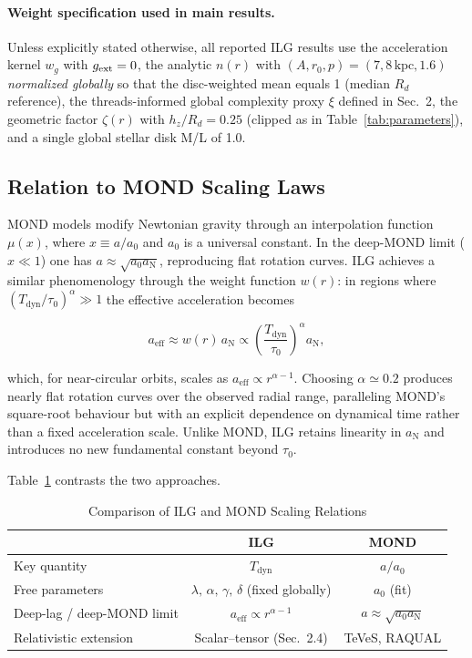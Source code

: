 \documentclass[12pt,a4paper]{article}
\begin{document}
\paragraph{Weight specification used in main results.} Unless explicitly stated otherwise, all reported ILG results use the acceleration kernel $w_g$ with $g_{\rm ext}=0$, the analytic $n(r)$ with $(A,r_0,p)=(7,8\,\mathrm{kpc},1.6)$ \emph{normalized globally} so that the disc-weighted mean equals 1 (median $R_d$ reference), the threads-informed global complexity proxy $\xi$ defined in Sec.~2, the geometric factor $\zeta(r)$ with $h_z/R_d=0.25$ (clipped as in Table~\ref{tab:parameters}), and a single global stellar disk M/L of 1.0.

\subsection{Relation to MOND Scaling Laws}

MOND models modify Newtonian gravity through an interpolation function $\mu(x)$, where $x \equiv a/a_0$ and $a_0$ is a universal constant.  In the deep-MOND limit ($x \ll 1$) one has $a \approx \sqrt{a_0 a_\mathrm{N}}$, reproducing flat rotation curves.  ILG achieves a similar phenomenology through the weight function $w(r)$: in regions where $(T_\mathrm{dyn}/\tau_0)^\alpha \gg 1$ the effective acceleration becomes

\begin{equation}
a_\mathrm{eff} \approx w(r) \, a_\mathrm{N} \propto \left(\frac{T_\mathrm{dyn}}{\tau_0}\right)^\alpha a_\mathrm{N},
\end{equation}

which, for near-circular orbits, scales as $a_\mathrm{eff} \propto r^{\alpha-1}$.  Choosing $\alpha \simeq 0.2$ produces nearly flat rotation curves over the observed radial range, paralleling MOND's square-root behaviour but with an explicit dependence on dynamical time rather than a fixed acceleration scale.  Unlike MOND, ILG retains linearity in $a_\mathrm{N}$ and introduces no new fundamental constant beyond $\tau_0$.

Table~\ref{tab:mond_compare} contrasts the two approaches.

\begin{table}[h]
\centering
\caption{Comparison of ILG and MOND Scaling Relations}
\label{tab:mond_compare}
\begin{tabular}{l c c}
\toprule
 & ILG & MOND \\
\midrule
Key quantity & $T_\mathrm{dyn}$ & $a/a_0$ \\
Free parameters & $\lambda,\,\alpha,\,\gamma,\,\delta$ (fixed globally) & $a_0$ (fit) \\
Deep-lag / deep-MOND limit & $a_\mathrm{eff} \propto r^{\alpha-1}$ & $a \approx \sqrt{a_0 a_\mathrm{N}}$ \\
Relativistic extension & Scalar–tensor (Sec.~2.4) & TeVeS, RAQUAL \\
\bottomrule
\end{tabular}
\end{table}
\end{document}
